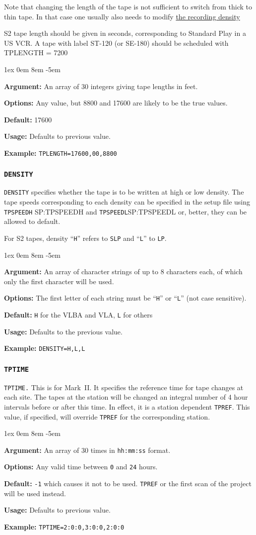 \documentclass{report}
\newcommand{\rcwbox}[5]{
  \begin{list}{}{\parsep 1ex  \itemsep 0em
                 \leftmargin 8em  \itemindent -5em }
    \item {\bf Argument:} #1
    \item {\bf Options:}  #2
    \item {\bf Default:}  #3
    \item {\bf Usage:}    #4
    \item {\bf Example:}  #5
  \end{list}
}
\begin{document}
Note that changing the length of the tape is not sufficient to switch
from thick to thin tape. In that case one usually also needs to modify
{\hyperref[TP:DENSITY]{the recording density}}

S2 tape length should be given in seconds, corresponding to Standard
Play in a US VCR. A tape with label ST-120 (or SE-180) should be
scheduled with TPLENGTH = 7200


\rcwbox
{An array of 30 integers giving tape lengths in feet.}
{Any value, but 8800 and 17600 are likely to be the true values.}
{17600}
{Defaults to previous value.}
{{\tt TPLENGTH=17600,00,8800}}

\subsubsection{\label{TP:DENSITY}{\tt DENSITY}}

{\tt DENSITY} specifies whether the tape is to be written at
high or low density.  The tape speeds corresponding to each density
can be specified in the setup file using {\tt TPSPEEDH} {SP:TPSPEEDH}
and {\tt TPSPEEDL}{SP:TPSPEEDL} or, better, they can be allowed to
default.

For S2 tapes, density ``{\tt H}'' refers to {\tt SLP} and ``{\tt L}''
to {\tt LP}.

\rcwbox
{An array of character strings of up to 8 characters each, of which
only the first character will be used.}
{The first letter of each string must be ``{\tt H}'' or ``{\tt L}''
(not case sensitive).}
{{\tt H} for the VLBA and VLA, {\tt L} for others}
{Defaults to the previous value.}
{{\tt DENSITY=H,L,L}}

\subsubsection{\label{TP:TPTIME}{\tt TPTIME}}

{\tt TPTIME.} This is for Mark~II. It specifies the reference
time for tape changes at each  site. The tapes at the station will be
changed an integral number of 4 hour intervals before or after this
time. In effect, it is a station dependent {\tt TPREF}. This value, if
specified, will override {\tt TPREF} for the corresponding station.

\rcwbox
{An array of 30 times in {\tt hh:mm:ss} format.}
{Any valid time between {\tt 0} and {\tt 24} hours.}
{{\tt -1} which causes it not to be used. {\tt TPREF} or the first
scan of the project will be used instead.}
{Defaults to previous value.}
{{\tt TPTIME=2:0:0,3:0:0,2:0:0}}
\end{document}
